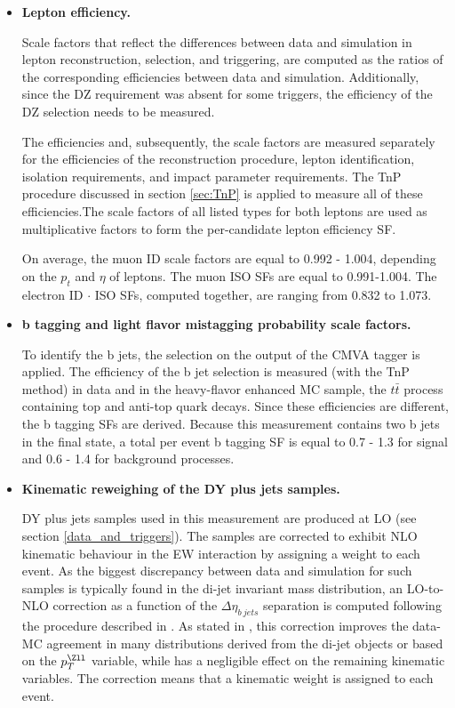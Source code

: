 \begin{itemize}

\item{\bfseries Lepton efficiency.} 

Scale factors that reflect the differences between data and simulation in lepton 
reconstruction, selection, and triggering, are computed as the ratios of the corresponding
efficiencies between data and simulation. Additionally, since the DZ requirement was absent for some triggers, the efficiency of the DZ selection needs to be measured. 

The efficiencies and, subsequently, the scale factors are measured separately for the efficiencies of the reconstruction procedure, lepton identification, isolation requirements, and impact parameter requirements. The TnP procedure discussed in section \ref{sec:TnP} is applied to measure all of these efficiencies.The scale factors of all listed types for both leptons are used as multiplicative factors
to form the per-candidate lepton efficiency SF.

On average, the muon ID scale factors are equal to 0.992 - 1.004, depending on the $p_t$ and $\eta$ of leptons. The muon ISO SFs are equal to 0.991-1.004. The electron ID $\cdot$ ISO SFs, computed together, are ranging from 0.832 to 1.073.

\item{\bfseries b tagging and light flavor mistagging probability scale factors.} 

To identify the b jets, the selection on the output of the CMVA tagger is applied. The efficiency of the b jet selection is measured (with the TnP method) in data and in the heavy-flavor enhanced MC sample, the $t\bar{t}$ process containing top and anti-top quark decays. Since these efficiencies are different, the b tagging SFs are derived. Because this measurement contains two b jets in the final state, a total per event b tagging SF is equal to 0.7 - 1.3 for signal and 0.6 - 1.4 for background processes. 

\item{\bfseries Kinematic reweighing of the DY plus jets samples.} 

DY plus jets samples used in this measurement are produced at LO (see section \ref{data_and_triggers}). The samples are corrected to exhibit NLO kinematic behaviour in the EW interaction by assigning a weight to each event. As the biggest discrepancy between data and simulation for such samples is typically found in the di-jet invariant mass distribution, an LO-to-NLO correction as a function of the $\Delta \eta_{b\ jets}$ separation is computed following the procedure described in \cite{DYLOtoNLO}. As stated in \cite{DYLOtoNLO}, this correction improves the data-MC agreement in many distributions derived from the di-jet objects or based on the $p_T^{\Zll}$ variable, while has a negligible effect on the remaining kinematic variables. The correction means that a kinematic weight is assigned to each event.


\end{itemize}
